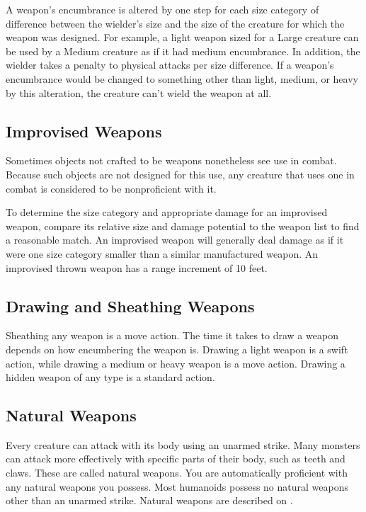  A weapon's encumbrance is altered by one step for each size category of difference between the wielder's size and the size of the creature for which the weapon was designed. For example, a light weapon sized for a Large creature can be used by a Medium creature as if it had medium encumbrance. In addition, the wielder takes a  penalty to physical attacks per size difference. If a weapon's encumbrance would be changed to something other than light, medium, or heavy by this alteration, the creature can't wield the weapon at all.

\subsection{Improvised Weapons} Sometimes objects not crafted to be weapons nonetheless see use in combat. Because such objects are not designed for this use, any creature that uses one in combat is considered to be nonproficient with it.

To determine the size category and appropriate damage for an improvised weapon, compare its relative size and damage potential to the weapon list to find a reasonable match. An improvised weapon will generally deal damage as if it were one size category smaller than a similar manufactured weapon. An improvised thrown weapon has a range increment of 10 feet.

\subsection{Drawing and Sheathing Weapons}\label{Drawing and Sheathing Weapons}
Sheathing any weapon is a move action. The time it takes to draw a weapon depends on how encumbering the weapon is. Drawing a light weapon is a swift action, while drawing a medium or heavy weapon is a move action. Drawing a hidden weapon of any type is a standard action.

\subsection{Natural Weapons}\label{Natural Weapons}
Every creature can attack with its body using an unarmed strike. Many monsters can attack more effectively with specific parts of their body, such as teeth and claws. These are called natural weapons. You are automatically proficient with any natural weapons you possess. Most humanoids possess no natural weapons other than an unarmed strike. Natural weapons are described on .

